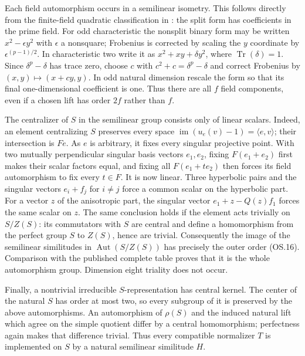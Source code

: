 Each field automorphism occurs in a semilinear isometry.  This
follows directly from the finite-field quadratic classification
in \cite[pp.~138--140]{OS:Taylor1992}: the split form has coefficients
in the prime field.  For odd characteristic the nonsplit binary
form may be written $x^2-\epsilon y^2$ with $\epsilon$ a nonsquare;
Frobenius is corrected by scaling the $y$ coordinate by
$\epsilon^{(p-1)/2}$.  In characteristic two write it as
$x^2+xy+\delta y^2$, where $\operatorname{Tr}(\delta)=1$.
Since $\delta^p-\delta$ has trace zero, choose $c$ with
$c^2+c=\delta^p-\delta$ and correct Frobenius by
$(x,y)\mapsto(x+cy,y)$.  In odd natural dimension rescale the form
so that its final one-dimensional coefficient is one.  Thus there
are all $f$ field components, even if a chosen lift has order
$2f$ rather than $f$.

The centralizer of $S$ in the semilinear group consists only of
linear scalars.  Indeed, an element centralizing $S$ preserves
every space $\operatorname{im}(u_e(v)-1)=\langle e,v\rangle$;
their intersection is $Fe$.  As $e$ is arbitrary, it fixes every
singular projective point.  With two mutually perpendicular singular
basis vectors $e_1,e_2$, fixing $F(e_1+e_2)$ first makes their
scalar factors equal, and fixing all $F(e_1+te_2)$ then forces its
field automorphism to fix every $t\in F$.  It is now linear.  Three
hyperbolic pairs and the singular vectors $e_i+f_j$ for $i\ne j$
force a common scalar on the hyperbolic part.  For a vector $z$ of
the anisotropic part, the singular vector
$e_1+z-Q(z)f_1$ forces the same scalar on $z$.
The same conclusion holds if the element acts trivially on
$S/Z(S)$: its commutators with $S$ are central and define a
homomorphism from the perfect group $S$ to $Z(S)$, hence are trivial.
Consequently the image of the semilinear similitudes in
$\operatorname{Aut}(S/Z(S))$ has precisely the outer order (OS.16).
Comparison with the published complete table proves that it is the
whole automorphism group.  Dimension eight triality does not occur.

Finally, a nontrivial irreducible $S$-representation has central
kernel.  The center of the natural $S$ has order at most two, so
every subgroup of it is preserved by the above automorphisms.
An automorphism of $\rho(S)$ and the induced natural lift which
agree on the simple quotient differ by a central homomorphism;
perfectness again makes that difference trivial.  Thus every
compatible normalizer $T$ is implemented on $S$ by a natural
semilinear similitude $H$.

